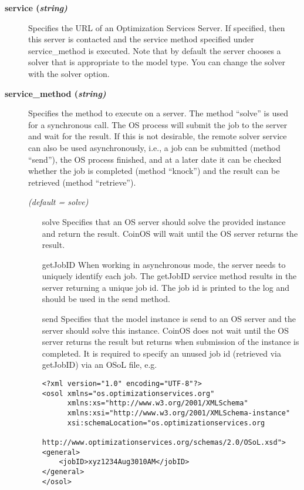 \begin{description}
\item[\label{service}\hypertarget{service}
{\textbf{service (\slshape{string})}}]\hspace{1.0in}

Specifies the URL of an Optimization Services Server.
If specified, then this server is contacted and the service method specified under service\_method is executed.
Note that by default the server chooses a solver that is appropriate to the model type.
You can change the solver with the solver option.


\item[\label{service_method}\hypertarget{service_method}
{\textbf{service\_method (\slshape{string})}}]\hspace{1.0in}

Specifies the method to execute on a server.
The method ``solve'' is used for a synchronous call. 
The OS process will submit the job to the server and wait for the result.
If this is not desirable, the remote solver service can also be used asynchronously, i.e., a job can be submitted (method ``send''), the OS process finished, and at a later date it can be checked whether the job is completed (method ``knock'') and the result can be retrieved (method ``retrieve'').

\textsl{(default = solve)}
\begin{itemize}
\item[solve] 
Specifies that an OS server should solve the provided instance and return the result.
CoinOS will wait until the OS server returns the result.
\item[getJobID] 
When working in asynchronous mode, the server needs to uniquely identify each job.
The getJobID service method results in the server returning a unique job id.
The job id is printed to the log and should be used in the send method.

\item[send] 
Specifies that the model instance is send to an OS server and the server should solve this instance.
CoinOS does not wait until the OS server returns the result but returns when submission of the instance is completed.
It is required to specify an unused job id (retrieved via getJobID) via an OSoL file, e.g.
\begin{verbatim}
<?xml version="1.0" encoding="UTF-8"?>
<osol xmlns="os.optimizationservices.org"
      xmlns:xs="http://www.w3.org/2001/XMLSchema"
      xmlns:xsi="http://www.w3.org/2001/XMLSchema-instance"
      xsi:schemaLocation="os.optimizationservices.org
                          http://www.optimizationservices.org/schemas/2.0/OSoL.xsd">
<general>
    <jobID>xyz1234Aug3010AM</jobID>
</general>
</osol>
\end{verbatim}


\end{itemize}
\end{description}

